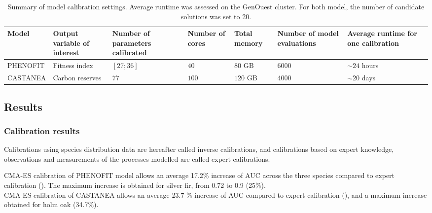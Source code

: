 \begin{table}

\caption{\label{tab:modelstable}Summary of model calibration settings. Average runtime was assessed on the GenOuest cluster. For both model, the number of candidate solutions was set to 20.}
\centering
\small

\begin{tabu} to 
\toprule
Model & Output variable of interest & Number of parameters calibrated & Number of cores & Total memory & Number of model evaluations & Average runtime for one calibration\\
\midrule
PHENOFIT & Fitness index & $[27;36]$ & $40$ & $80$ GB & 6000 & $\sim 24$ hours\\
\addlinespace
CASTANEA & Carbon reserves & $77$ & $100$ & $120$ GB & 4000 & $\sim 20$ days\\
\bottomrule
\end{tabu}
\end{table}

\subsection{Results}\label{results}

\subsubsection{Calibration results}\label{calibration-results}

Calibrations using species distribution data are hereafter called
inverse calibrations, and calibrations based on expert knowledge,
observations and measurements of the processes modelled are called
expert calibrations.

CMA-ES calibration of PHENOFIT model allows an average 17.2\% increase
of AUC across the three species compared to expert calibration
(). The maximum increase is
obtained for silver fir, from 0.72 to 0.9 (25\%).\\
CMA-ES calibration of CASTANEA allows an average 23.7 \% increase of AUC
compared to expert calibration (),
and a maximum increase obtained for holm oak (34.7\%).

